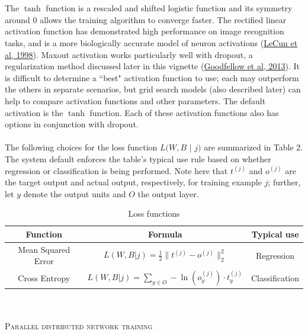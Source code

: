 \documentclass[12pt]{article}
\begin{document}
\\
\\
The $\tanh$ function is a rescaled and shifted logistic function and its symmetry around 0 allows the training algorithm to converge faster. The rectified linear activation function has demonstrated high performance on image recognition tasks, and is a more biologically accurate model of neuron activations (\href{http://yann.lecun.com/exdb/publis/pdf/lecun-98b.pdf}{LeCun et al, 1998}). Maxout activation works particularly well with dropout, a regularization method discussed later in this vignette (\href{http://arxiv.org/pdf/1302.4389.pdf}{Goodfellow et al, 2013}). It is difficult to determine a ``best" activation function to use; each may outperform the others in separate scenarios, but grid search models (also described later) can help to compare activation functions and other parameters. The default activation is the $\tanh$ function. Each of these activation functions also has options in conjunction with dropout.
\\
\\
The following choices for the loss function $L(W,B$ $|$ $ j)$ are summarized in Table 2. The system default enforces the table's typical use rule based on whether regression or classification is being performed. Note here that $t^{(j)}$ and $o^{(j)}$ are the target output and actual output, respectively, for training example $j$; further, let $y$ denote the output units and $O$ the output layer.  
\\
\begin{table}[ht] 
\caption{Loss functions }
\centering %
\begin{tabular}{c c c} %
\hline\hline %
Function & Formula & Typical use \\ [0.5ex] %
\hline %
Mean Squared Error & $L(W,B | j) = \frac{1}{2}\|t^{(j)} - o^{(j)}\|_2^2$ & Regression \\ %
Cross Entropy & $L(W,B | j) = \sum\limits_{y \in O} -\ln(o_y^{(j)}) \cdot t_y^{(j)}$ & Classification \\  
\hline %
\end{tabular} 
\label{table:nonlin} %
\end{table}
\\
\\
\noindent
\textsc{Parallel distributed network training}
\end{document}
